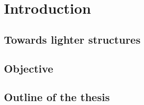 \chapter*{Introduction}

\section*{Towards lighter structures}

\section*{Objective}

\section*{Outline of the thesis}